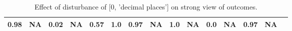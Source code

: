 \begin{table}
\begin{tabular}{l|cc|cc|cc|cc|cc|cc|cc}
\cellcolor{Bittersweet}0.98&\cellcolor{Bittersweet}NA&\cellcolor{Bittersweet}0.02&\cellcolor{Bittersweet}NA&\cellcolor{Bittersweet}0.57&\cellcolor{Bittersweet}1.0&\cellcolor{Bittersweet}0.97&\cellcolor{Bittersweet}NA&\cellcolor{Bittersweet}1.0&\cellcolor{Bittersweet}NA&\cellcolor{Bittersweet}0.0&\cellcolor{Bittersweet}NA&\cellcolor{Bittersweet}0.97&\cellcolor{Bittersweet}NA\\\bottomrule\end{tabular}\caption{Effect of disturbance of [0, 'decimal places'] on strong view of outcomes.}\end{table}